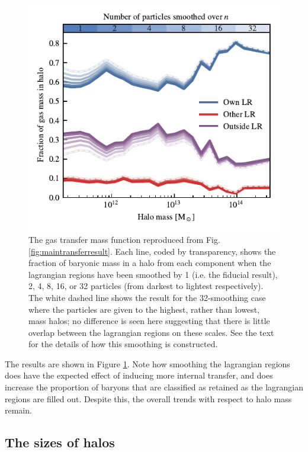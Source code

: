 \begin{figure}
	\centering
	\includegraphics{figures/convergence_smoothing.pdf}
	\vspace{-0.7cm}
	\caption{The gas transfer mass function reproduced from Fig.
     \ref{fig:maintransferresult}. Each line, coded by transparency, shows the
     fraction of baryonic mass in a halo from each component when the lagrangian
     regions have been smoothed by 1 (i.e. the fiducial result), 2, 4, 8, 16, or
     32 particles (from darkest to lightest respectively). The white dashed line
     shows the result for the 32-smoothing case where the particles are given to
     the highest, rather than lowest, mass halos; no difference is seen here
     suggesting that there is little overlap between the lagrangian regions on
     these scales. See the text for the details of how this smoothing is
     constructed.}
	\label{fig:smoothconv}
\end{figure}

The results are shown in Figure \ref{fig:smoothconv}. Note how smoothing the
lagrangian regions does have the expected effect of inducing more internal
transfer, and does increase the proportion of baryons that are classified as
retained as the lagrangian regions are filled out. Despite this, the overall
trends with respect to halo mass remain.

\subsection{The sizes of halos}

